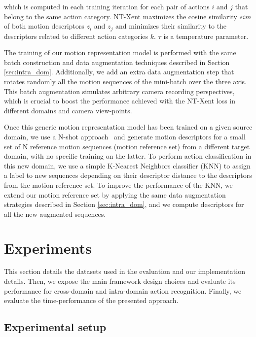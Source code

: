 \documentclass[letterpaper, 10 pt, conference]{ieeeconf}
\begin{document}
\noindent which is computed in each training iteration for each pair of actions \(i\) and \(j\) that belong to the same action category. 
NT-Xent maximizes the cosine similarity \(sim\) of both motion descriptors \(z_i\) and \(z_j\) and minimizes their similarity to the descriptors related to different action categories \(k\). \(\tau\) is a temperature parameter.



The training of our motion representation model is performed with the same batch construction and data augmentation techniques described in Section \ref{sec:intra_dom}. Additionally, we add an extra data augmentation step that rotates randomly all the motion sequences of the mini-batch over the three axis. This batch augmentation simulates arbitrary camera recording perspectives, which is crucial to boost the performance achieved with the NT-Xent loss in different domains and camera view-points. 


Once this generic motion representation model has been trained on a given source domain, we use a N-shot approach~\cite{wang2019simpleshot} and generate motion descriptors for a small set of N reference motion sequences (motion reference set) from a different target domain, with no specific training on the latter. To perform action classification in this new domain, 
we use a simple K-Nearest Neighbors classifier (KNN) to assign a label to new sequences depending on their descriptor distance to the descriptors from the motion reference set. To improve the performance of the KNN, 
we extend our motion reference set by applying the same data augmentation strategies described in Section \ref{sec:intra_dom}, and we compute descriptors for all the new augmented sequences. 











\section{Experiments}
This section details the datasets used in the evaluation and our implementation details.
Then, we expose the main framework design choices and evaluate its performance for cross-domain and intra-domain action recognition.
Finally, we evaluate the time-performance of the presented approach.

\subsection{Experimental setup}
\end{document}
